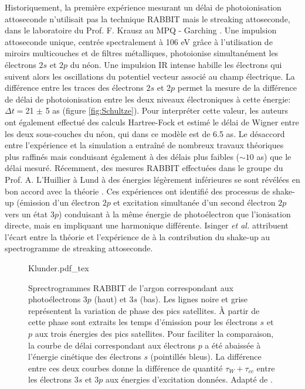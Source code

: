 Historiquement, la première expérience mesurant un délai de photoionisation attoseconde n'utilisait pas la technique RABBIT mais le streaking attoseconde, dans le laboratoire du Prof. F. Krausz au MPQ - Garching . Une impulsion attoseconde unique, centrée spectralement à 106 eV grâce à l'utilisation de miroirs multicouches et de filtres métalliques, photoionise simultanément les électrons $2s$ et $2p$ du néon. Une impulsion IR intense habille les électrons qui suivent alors les oscillations du potentiel vecteur associé au champ électrique. La différence entre les traces des électrons $2s$ et $2p$ permet la mesure de la différence de délai de photoionisation entre les deux niveaux électroniques à cette énergie: $\Delta t =$21 $\pm$ 5 as (figure \ref{fig:Schultze}). Pour interpréter cette valeur, les auteurs ont également effectué des calculs Hartree-Fock et estimé le délai de Wigner entre les deux sous-couches du néon, qui dans ce modèle est de 6.5 as. Le désaccord entre l'expérience et la simulation a entraîné de nombreux travaux théoriques  plus raffinés mais conduisant également à des délais plus faibles ($\sim 10$ as) que le délai mesuré. Récemment, des mesures RABBIT effectuées dans le groupe du Prof. A. L'Huillier à Lund à des énergies légèrement inférieures se sont révélées en bon accord avec la théorie . Ces expériences ont identifié des processus de shake-up (émission d'un électron $2p$ et excitation simultanée d'un second électron $2p$ vers un état $3p$) conduisant à la même énergie de photoélectron que l'ionisation directe, mais en impliquant une harmonique différente. Isinger \textit{et al.} attribuent l'écart entre la théorie et l'expérience de  à la contribution du shake-up au spectrogramme de streaking attoseconde.

\begin{figure}[h]
\centering
\def\svgwidth{0.6\columnwidth}
{Klunder.pdf_tex}
\caption{Sprectrogrammes RABBIT de l'argon correspondant aux photoélectrons $3p$ (haut) et $3s$ (bas). Les lignes noire et grise représentent la variation de phase des pics satellites. \`A partir de cette phase sont extraits les temps d'émission pour les électrons $s$ et $p$ aux trois énergies des pics satellites. Pour faciliter la comparaison, la courbe de délai correspondant aux électrons $p$ a été abaissée à l'énergie cinétique des électrons $s$ (pointillés bleus). La différence entre ces deux courbes donne la différence de quantité $\tau_W + \tau_{cc}$ entre les électrons $3s$ et $3p$ aux énergies d'excitation données. Adapté de .}
\label{fig:Klunder}
\end{figure}


